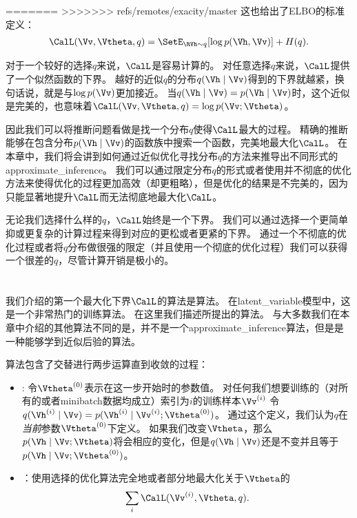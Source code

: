 =======
>>>>>>> refs/remotes/exacity/master
这也给出了\gls{ELBO}的标准定义：
\begin{align}
\CalL(\Vv,{\Vtheta},q) = \SetE_{\RVh\sim q}[\log p(\Vh , \Vv)] + H(q).
\end{align}


对于一个较好的选择$q$来说，$\CalL$是容易计算的。
对任意选择$q$来说，$\CalL$提供了一个似然函数的下界。
越好的近似$q$的分布$q(\Vh\mid\Vv)$得到的下界就越紧，换句话说，就是与$\log p(\Vv)$更加接近。
当$q(\Vh\mid\Vv) = p(\Vh\mid\Vv)$时，这个近似是完美的，也意味着$\CalL(\Vv,{\Vtheta},q) = \log {p(\Vv;{\Vtheta})} $。


因此我们可以将推断问题看做是找一个分布$q$使得$\CalL$最大的过程。
精确的推断能够在包含分布$p(\Vh\mid\Vv)$的函数族中搜索一个函数，完美地最大化$\CalL$。
在本章中，我们将会讲到如何通过近似优化寻找分布$q$的方法来推导出不同形式的\gls{approximate_inference}。
我们可以通过限定分布$q$的形式或者使用并不彻底的优化方法来使得优化的过程更加高效（却更粗略），但是优化的结果是不完美的，因为只能显著地提升$\CalL$而无法彻底地最大化$\CalL$。


无论我们选择什么样的$q$，$\CalL$始终是一个下界。
我们可以通过选择一个更简单抑或更复杂的计算过程来得到对应的更松或者更紧的下界。
通过一个不彻底的优化过程或者将$q$分布做很强的限定（并且使用一个彻底的优化过程）我们可以获得一个很差的$q$，尽管计算开销是极小的。


\section{}
\label{sec:expectation_maximization}

我们介绍的第一个最大化下界$\CalL$的算法是算法。
在\gls{latent_variable}模型中，这是一个非常热门的训练算法。
在这里我们描述\citet{emview}所提出的算法。
与大多数我们在本章中介绍的其他算法不同的是，并不是一个\gls{approximate_inference}算法，但是是一种能够学到近似后验的算法。


算法包含了交替进行两步运算直到收敛的过程：
\begin{itemize}
\item {}: 令${\Vtheta^{(0)}}$表示在这一步开始时的参数值。
对任何我们想要训练的（对所有的或者\gls{minibatch}数据均成立）索引为$i$的训练样本$\Vv^{(i)}$ 令$q(\Vh^{(i)}\mid \Vv) = p(\Vh^{(i)}\mid\Vv^{(i)};\Vtheta^{(0)})$。
通过这个定义，我们认为$q$在\emph{当前}参数$\Vtheta^{(0)}$下定义。
如果我们改变$\Vtheta$，那么$p(\Vh\mid\Vv;\Vtheta)$将会相应的变化，但是$q(\Vh\mid\Vv)$还是不变并且等于$p(\Vh\mid\Vv;\Vtheta^{(0)})$。
\item {}：使用选择的优化算法完全地或者部分地最大化关于$\Vtheta$的
\begin{align}
\sum_i \CalL(\Vv^{(i)},\Vtheta,q).
\end{align}
\end{itemize}


